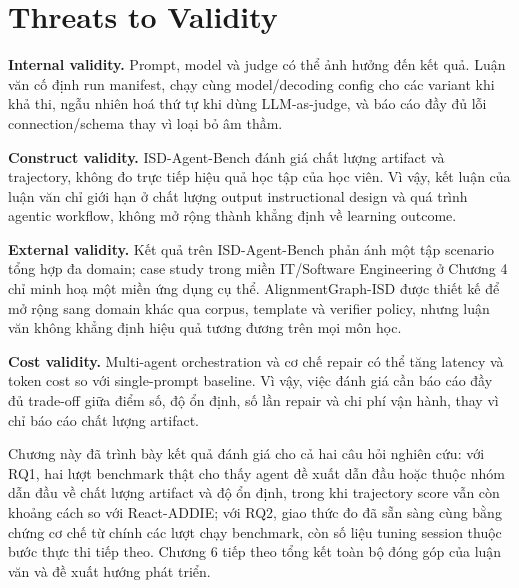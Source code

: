 \documentclass[../main.tex]{subfiles}
\begin{document}
\section{Threats to Validity}

\textbf{Internal validity.} Prompt, model và judge có thể ảnh hưởng đến kết quả. Luận văn cố định run manifest, chạy cùng model/decoding config cho các variant khi khả thi, ngẫu nhiên hoá thứ tự khi dùng LLM-as-judge, và báo cáo đầy đủ lỗi connection/schema thay vì loại bỏ âm thầm.

\textbf{Construct validity.} ISD-Agent-Bench đánh giá chất lượng artifact và trajectory, không đo trực tiếp hiệu quả học tập của học viên. Vì vậy, kết luận của luận văn chỉ giới hạn ở chất lượng output instructional design và quá trình agentic workflow, không mở rộng thành khẳng định về learning outcome.

\textbf{External validity.} Kết quả trên ISD-Agent-Bench phản ánh một tập scenario tổng hợp đa domain; case study trong miền IT/Software Engineering ở Chương 4 chỉ minh hoạ một miền ứng dụng cụ thể. AlignmentGraph-ISD được thiết kế để mở rộng sang domain khác qua corpus, template và verifier policy, nhưng luận văn không khẳng định hiệu quả tương đương trên mọi môn học.

\textbf{Cost validity.} Multi-agent orchestration và cơ chế repair có thể tăng latency và token cost so với single-prompt baseline. Vì vậy, việc đánh giá cần báo cáo đầy đủ trade-off giữa điểm số, độ ổn định, số lần repair và chi phí vận hành, thay vì chỉ báo cáo chất lượng artifact.

Chương này đã trình bày kết quả đánh giá cho cả hai câu hỏi nghiên cứu: với RQ1, hai lượt benchmark thật cho thấy agent đề xuất dẫn đầu hoặc thuộc nhóm dẫn đầu về chất lượng artifact và độ ổn định, trong khi trajectory score vẫn còn khoảng cách so với React-ADDIE; với RQ2, giao thức đo đã sẵn sàng cùng bằng chứng cơ chế từ chính các lượt chạy benchmark, còn số liệu tuning session thuộc bước thực thi tiếp theo. Chương 6 tiếp theo tổng kết toàn bộ đóng góp của luận văn và đề xuất hướng phát triển.
\end{document}

